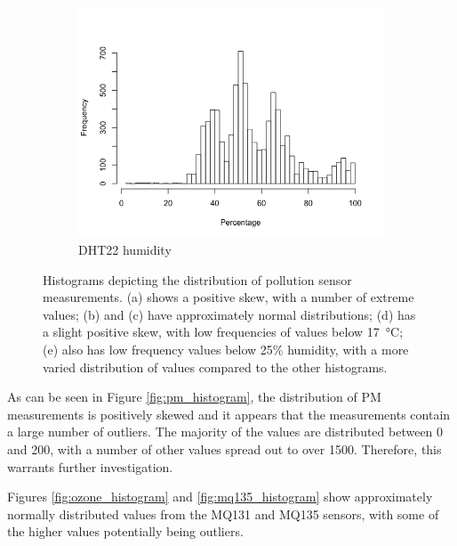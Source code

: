 \documentclass[11pt]{report}
\begin{document}
\begin{figure}[!tbp]
\begin{minipage}{1\linewidth}
\begin{subfigure}[t]{.5\linewidth}
            	\label{fig:temp_histogram}
	   \end{subfigure}
        \end{minipage}
    \begin{minipage}{1\linewidth}
    	\centering
        \begin{subfigure}[t]{.5\linewidth}
            \includegraphics[width=\textwidth]{images/humidity_histogram}
            \caption{DHT22 humidity}
            \label{fig:humidity_histogram}
        \end{subfigure}
    \end{minipage}
    \caption[Sensor measurement histograms.]{Histograms depicting the distribution of pollution sensor measurements. (a) shows a positive skew, with a number of extreme values; (b) and (c) have approximately normal distributions; (d) has a slight positive skew, with low frequencies of values below \SI{17}{\celsius}; (e) also has low frequency values below 25\% humidity, with a more varied distribution of values compared to the other histograms.}
\end{figure}

As can be seen in Figure \ref{fig:pm_histogram}, the distribution of PM measurements is positively skewed and it appears that the measurements contain a large number of outliers. The majority of the values are distributed between 0 and 200, with a number of other values spread out to over \num{1500}. Therefore, this warrants further investigation.

Figures \ref{fig:ozone_histogram} and \ref{fig:mq135_histogram} show approximately normally distributed values from the MQ131 and MQ135 sensors, with some of the higher values potentially being outliers.
\end{document}

